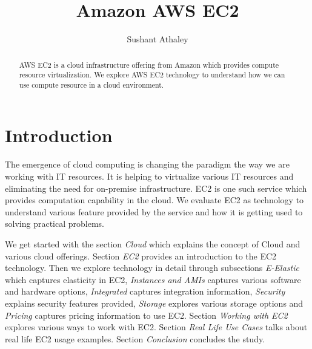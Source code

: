 
\title{Amazon AWS EC2}


\author{Sushant Athaley}

\renewcommand{\shortauthors}{G. v. Laszewski}


\begin{abstract}

AWS EC2 is a cloud infrastructure offering from Amazon which provides compute resource virtualization. We explore AWS EC2 technology to understand how we can use compute resource in a cloud environment. 

\end{abstract}


\maketitle

\section{Introduction}

The emergence of cloud computing is changing the paradigm the way we are working with IT resources. It is helping to virtualize various IT resources and eliminating the need for on-premise infrastructure. EC2 is one such service which provides computation capability in the cloud. We evaluate EC2 as technology to understand various feature provided by the service and how it is getting used to solving practical problems.

We get started with the section \emph{Cloud} which explains the concept of Cloud and various cloud offerings. Section \emph{EC2} provides an introduction to the EC2 technology. Then we explore technology in detail through subsections \emph{E-Elastic} which captures elasticity in EC2, \emph{Instances and AMIs} captures various software and hardware options, \emph{Integrated} captures integration information, \emph{Security} explains security features provided, \emph{Storage} explores various storage options and \emph{Pricing} captures pricing information to use EC2.
Section \emph{Working with EC2} explores various ways to work with EC2. Section \emph{Real Life Use Cases} talks about real life EC2 usage examples. Section \emph{Conclusion} concludes the study. 

